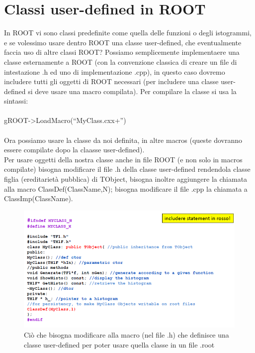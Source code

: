 \documentclass[10pt,a4paper]{article}
\begin{document}
\section{Classi user-defined in ROOT}
In ROOT vi sono classi predefinite come quella delle funzioni o degli istogrammi, e se volessimo usare dentro ROOT una classe user-defined, che eventualmente faccia uso di altre classi ROOT? Possiamo semplicemente implementaere una classe esternamente a ROOT (con la convenzione classica di creare un file di intestazione .h ed uno di implementazione .cpp), in questo caso dovremo includere tutti gli oggetti di ROOT necessari (per includere una classe user-defined si deve usare una macro compilata). Per compilare la classe si usa la sintassi:\\\\
gROOT->LoadMacro(“MyClass.cxx+”)\\\\
Ora possiamo usare la classe da noi definita, in altre macros (queste dovranno essere compilate dopo la claasse user-defined).\\
Per usare oggetti della nostra classe anche in file ROOT (e non solo in macros compilate) bisogna modificare il file .h della classe user-defined rendendola classe figlia (ereditarietà pubblica) di TObject, bisogna inoltre aggiungere la chiamata alla macro ClassDef(ClassName,N); bisogna modificare il file .cpp la chiamata a ClassImp(ClassName).
\begin{figure}[h!]
	\centering
	\includegraphics[width=1.\linewidth]{classi-root-1}
	\caption{Ciò che bisogna modificare alla macro (nel file .h) che definisce una classe user-defined per poter usare quella classe in un file .root}
	\label{fig:classi-root-1}
\end{figure}
\FloatBarrier
\end{document}
